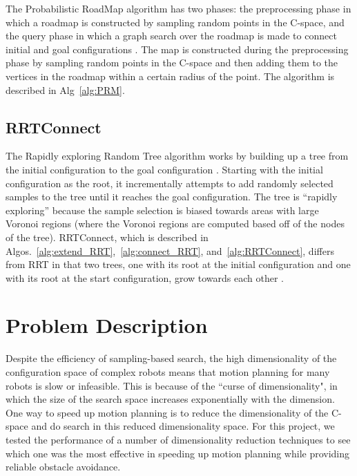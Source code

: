 \documentclass[12pt]{article}
\begin{document}
The Probabilistic RoadMap algorithm has two phases: the preprocessing phase in
which a roadmap is constructed by sampling random points in the C-space, and
the query phase in which a graph search over the roadmap is made to connect
initial and goal configurations \cite{kavraki1996prm}. The map is constructed
during the preprocessing phase by sampling random points in the C-space and
then adding them to the vertices in the roadmap within a certain radius of the
point. The algorithm is described in Alg~\ref{alg:PRM}.

\subsection{RRTConnect}

The Rapidly exploring Random Tree algorithm works by building up a tree from
the initial configuration to the goal configuration \cite{lavalle1998rrt}.
Starting with the initial configuration as the root, it incrementally attempts
to add randomly selected samples to the tree until it reaches the goal
configuration.  The tree is ``rapidly exploring'' because the sample selection
is biased towards areas with large Voronoi regions (where the Voronoi regions
are computed based off of the nodes of the tree). RRTConnect, which is
described in Algos.~\ref{alg:extend_RRT},~\ref{alg:connect_RRT},
and~\ref{alg:RRTConnect}, differs from RRT in that two trees, one with its root
at the initial configuration and one with its root at the start configuration,
grow towards each other \cite{kuffner2000rrt}.

\section{Problem Description}

Despite the efficiency of sampling-based search, the high dimensionality of the
configuration space of complex robots means that motion planning for many
robots is slow or infeasible. This is because of the ``curse of dimensionality",
in which the size of the search space increases exponentially with the
dimension. One way to speed up motion planning is to reduce the dimensionality
of the C-space and do search in this reduced dimensionality space. For this
project, we tested the performance of a number of dimensionality reduction
techniques to see which one was the most effective in speeding up motion
planning while providing reliable obstacle avoidance.
\end{document}
